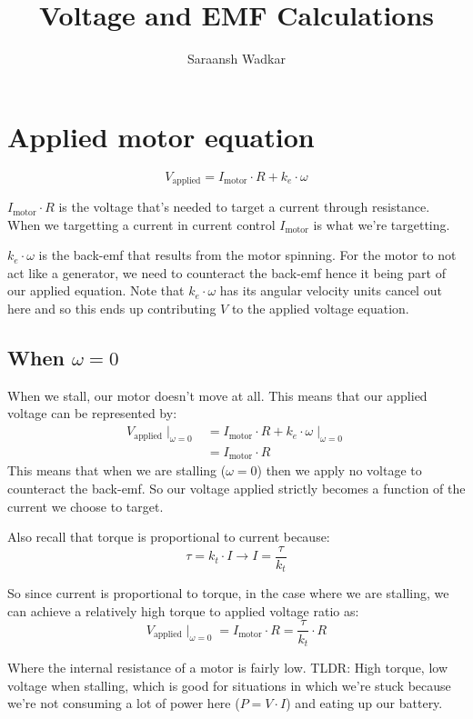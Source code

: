 \documentclass[12pt]{article}
\title{Voltage and EMF Calculations}
\author{Saraansh Wadkar}
\date{}
\begin{document}
\maketitle

\section{Applied motor equation}

\[
V_{\text{applied}} = I_{\text{motor}} \cdot R + k_e \cdot \omega
\]

\par $I_{\text{motor}} \cdot R$ is the voltage that's needed to target a current through resistance. When we targetting a current in current control $I_{\text{motor}}$ is what we're targetting.
\par $k_e \cdot \omega$ is the back-emf that results from the motor spinning. For the motor to not act like a generator, we need to counteract the back-emf hence it being part of our applied equation. Note that $k_e \cdot \omega$ has its angular velocity units cancel out here and so this ends up contributing $V$ to the applied voltage equation.

\subsection{When $\omega = 0$}
When we stall, our motor doesn't move at all. This means that our applied voltage can be represented by:
$$
\begin{aligned}
V_{\text{applied}} \mid_{\omega=0} &= I_{\text{motor}} \cdot R + k_e \cdot \omega \mid_{\omega=0}\\  &= I_{\text{motor}} \cdot R
\end{aligned}
$$
This means that when we are stalling ($\omega = 0$) then we apply no voltage to counteract the back-emf. So our voltage applied strictly becomes a function of the current we choose to target.

\par Also recall that torque is proportional to current because:
$$
\tau = k_t \cdot I \rightarrow I = \frac{\tau}{k_t}
$$

So since current is proportional to torque, in the case where we are stalling, we can achieve a relatively high torque to applied voltage ratio as:
$$
V_{\text{applied}} \mid_{\omega = 0} = I_{\text{motor}} \cdot R = \frac{\tau}{k_t} \cdot R
$$

Where the internal resistance of a motor is fairly low. TLDR: High torque, low voltage when stalling, which is good for situations in which we're stuck because we're not consuming a lot of power here ($P = V \cdot I$) and eating up our battery.
\end{document}
